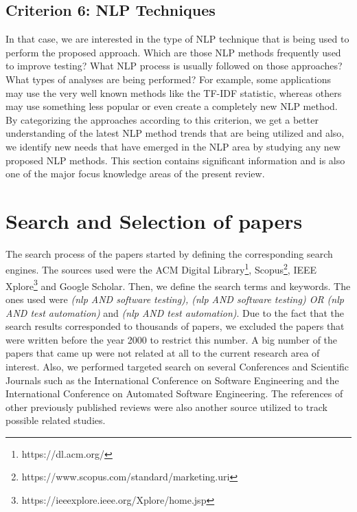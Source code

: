 \subsection {Criterion 6: NLP Techniques}
In that case, we are interested in the type of NLP technique that is being used to perform the proposed approach. Which are those NLP methods frequently used to improve testing? What NLP process is usually 
followed on those approaches? What types of analyses are being performed? For example, some applications may use the very well known methods 
like the TF-IDF statistic, whereas others may use something less popular or even create a completely new NLP method. By categorizing the approaches 
according to this criterion, we get a better understanding of the latest NLP method trends that are being utilized and also, we identify new needs that have emerged in the 
NLP area by studying any new proposed NLP methods. This section contains significant information and is also one of the major focus knowledge areas of the present review.

\section {Search and Selection of papers}
The search process of the papers started by defining the corresponding search engines. The sources used were the ACM Digital Library\footnote{https://dl.acm.org/}, Scopus\footnote{https://www.scopus.com/standard/marketing.uri}, 
IEEE Xplore\footnote{https://ieeexplore.ieee.org/Xplore/home.jsp} and Google Scholar. Then, we define the search terms and keywords. The ones used were \emph{(nlp AND software testing), (nlp 
AND software testing) OR (nlp AND test automation)} and \emph{(nlp AND test automation)}. Due to the fact that the search results corresponded 
to thousands of papers, we excluded the papers that were written before the year 2000 to restrict this number. A big number of the papers that came up 
were not related at all to the current research area of interest. Also, we performed targeted search on several Conferences and Scientific Journals such 
as the International Conference on Software Engineering and the International Conference on Automated Software Engineering. The references of other previously 
published reviews were also another source utilized to track possible related studies. \\

